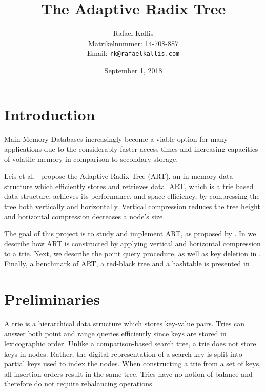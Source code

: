 \documentclass[abstracton,12pt]{scrartcl}
\title{The Adaptive Radix Tree}
\author{
    Rafael Kallis\\[-5pt]
    \scriptsize Matrikelnummer: 14-708-887\\[-5pt]
    \scriptsize Email: \texttt{rk@rafaelkallis.com}
}
\date{\vspace*{2cm}September 1, 2018}
\theoremstyle{definition}
\begin{document}
\maketitle





\newpage
\section{Introduction}

Main-Memory Databases increasingly become a viable option for many applications
due to the considerably faster access times and increasing capacities of 
volatile memory in comparison to secondary storage.

Leis et al.\ \cite{leis2013adaptive} propose the Adaptive Radix Tree (ART), an in-memory
data structure which efficiently stores and retrieves data.
ART, which is a trie based data structure, achieves its performance, and space
efficiency, by compressing the tree both vertically and horizontally.
Vertical compression reduces the tree height and horizontal compression
decreases a node's size.

The goal of this project is to study and implement ART, as proposed by 
\cite{leis2013adaptive}. 
In  we describe how ART is constructed by applying 
vertical and horizontal compression to a trie.
Next, we describe the point query procedure, as well as 
key deletion in .
Finally, a benchmark of ART, a red-black tree and a hashtable
is presented in .

\section{Preliminaries}\label{sec:preliminaries}

A trie \cite{fredkin1960trie} is a hierarchical data structure which
stores key-value pairs. Tries can answer both point and range queries 
efficiently since keys are stored in lexicographic order.
Unlike a comparison-based search tree, a trie does not store keys in nodes.
Rather, the digital representation of a search key is split into partial
keys used to index the nodes. When 
constructing a trie from a set of keys, all insertion orders result in the 
same tree. Tries have no notion of balance and therefore do not require 
rebalancing operations.
\end{document}
